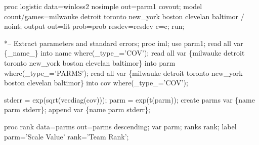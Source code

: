 \begin{listing}
proc logistic data=winloss2 nosimple out=parm1 covout;
  model count/games=milwauke detroit toronto new_york
                    boston clevelan baltimor / noint;
  output out=fit prob=prob resdev=resdev c=c;
run;

*-- Extract parameters and standard errors;
proc iml;
   use parm1;
   read all var \{_name_\} into name where(_type_='COV');
   read all var \{milwauke detroit toronto new_york
                 boston clevelan baltimor\} into parm where(_type_='PARMS');
   read all var \{milwauke detroit toronto new_york
                 boston clevelan baltimor\} into cov where(_type_='COV');

   stderr = exp(sqrt(vecdiag(cov)));
   parm = exp(t(parm));
   create parms var \{name parm stderr\};
   append var \{name parm stderr\};

proc rank data=parms out=parms descending;
   var parm;
   ranks rank;
   label parm='Scale Value'
      rank='Team Rank';
\end{listing}
